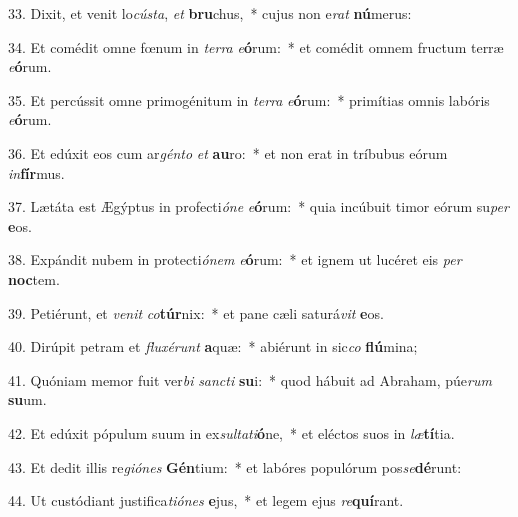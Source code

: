 33. Dixit, et venit lo\textit{cús}\textit{ta}, \textit{et} \textbf{bru}chus,~*  cujus non e\textit{rat} \textbf{nú}merus:\

34. Et comédit omne fœnum in \textit{ter}\textit{ra} \textit{e}\textbf{ó}rum:~*  et comédit omnem fructum terræ \textit{e}\textbf{ó}rum.\

35. Et percússit omne primogénitum in \textit{ter}\textit{ra} \textit{e}\textbf{ó}rum:~*  primítias omnis labóris \textit{e}\textbf{ó}rum.\

36. Et edúxit eos cum ar\textit{gén}\textit{to} \textit{et} \textbf{au}ro:~*  et non erat in tríbubus eórum \textit{in}\textbf{fír}mus.\

37. Lætáta est Ægýptus in profecti\textit{ó}\textit{ne} \textit{e}\textbf{ó}rum:~*  quia incúbuit timor eórum su\textit{per} \textbf{e}os.\

38. Expándit nubem in protecti\textit{ó}\textit{nem} \textit{e}\textbf{ó}rum:~*  et ignem ut lucéret eis \textit{per} \textbf{noc}tem.\

39. Petiérunt, et \textit{ve}\textit{nit} \textit{co}\textbf{túr}nix:~*  et pane cæli saturá\textit{vit} \textbf{e}os.\

40. Dirúpit petram et \textit{flu}\textit{xé}\textit{runt} \textbf{a}quæ:~*  abiérunt in sic\textit{co} \textbf{flú}mina;\

41. Quóniam memor fuit ver\textit{bi} \textit{sanc}\textit{ti} \textbf{su}i:~*  quod hábuit ad Abraham, púe\textit{rum} \textbf{su}um.\

42. Et edúxit pópulum suum in ex\textit{sul}\textit{ta}\textit{ti}\textbf{ó}ne,~*  et eléctos suos in \textit{læ}\textbf{tí}tia.\

43. Et dedit illis re\textit{gi}\textit{ó}\textit{nes} \textbf{Gén}tium:~*  et labóres populórum pos\textit{se}\textbf{dé}runt:\

44. Ut custódiant justifica\textit{ti}\textit{ó}\textit{nes} \textbf{e}jus,~*  et legem ejus \textit{re}\textbf{quí}rant.\

